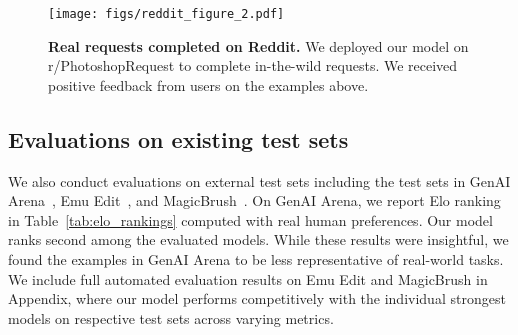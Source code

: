 \begin{figure}[!h]
    \centering
    \texttt{[image: figs/reddit\_figure\_2.pdf]}
    \caption{\textbf{Real requests completed on Reddit.} We deployed our model on r/PhotoshopRequest to complete in-the-wild requests. We received positive feedback from users on the examples above.}
    \label{fig:reddit_figure}
    \vspace{-2mm}
\end{figure}


\subsection{Evaluations on existing test sets}

We also conduct evaluations on external test sets including the test sets in GenAI Arena~\cite{jiang2024genai}, Emu Edit~\cite{sheynin2024emu}, and MagicBrush~\cite{zhang2024magicbrush}.
On GenAI Arena, we report Elo ranking in Table~\ref{tab:elo_rankings} computed with real human preferences.
Our model ranks second among the evaluated models. While these results were insightful, we found the examples in GenAI Arena to be less representative of real-world tasks. 
We include full automated evaluation results on Emu Edit and MagicBrush in Appendix, where our model performs competitively with the individual strongest models on respective test sets across varying metrics.

%



